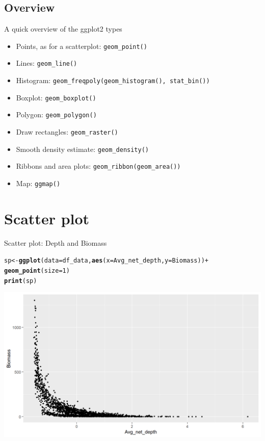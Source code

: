 \documentclass{beamer}\usepackage[]{graphicx}\usepackage[]{color}
\makeatletter
\newcommand{\hlnum}[1]{\textcolor[rgb]{0.686,0.059,0.569}{#1}}%
\newcommand{\hlopt}[1]{\textcolor[rgb]{0,0,0}{#1}}%
\newcommand{\hlstd}[1]{\textcolor[rgb]{0.345,0.345,0.345}{#1}}%
\newcommand{\hlkwb}[1]{\textcolor[rgb]{0.69,0.353,0.396}{#1}}%
\newcommand{\hlkwc}[1]{\textcolor[rgb]{0.333,0.667,0.333}{#1}}%
\newcommand{\hlkwd}[1]{\textcolor[rgb]{0.737,0.353,0.396}{\textbf{#1}}}%
\newenvironment{kframe}{%
 \def\at@end@of@kframe{}%
 \ifinner\ifhmode%
  \def\at@end@of@kframe{\end{minipage}}%
  \begin{minipage}{\columnwidth}%
 \fi\fi%
 \def\FrameCommand##1{\hskip\@totalleftmargin \hskip-\fboxsep
 \colorbox{shadecolor}{##1}\hskip-\fboxsep
     \hskip-\linewidth \hskip-\@totalleftmargin \hskip\columnwidth}%
 \MakeFramed {\advance\hsize-\width
   \@totalleftmargin\z@ \linewidth\hsize
   \@setminipage}}%
 {\par\unskip\endMakeFramed%
 \at@end@of@kframe}
\newenvironment{knitrout}{}{} %
\makeatother
\begin{document}
\subsection{Overview}
\begin{frame}[fragile]{A quick overview of the ggplot2 types}
\begin{itemize}
\item Points, as for a scatterplot: \lstinline{geom_point()}
\item Lines: \lstinline{geom_line()}
\item Histogram: \lstinline{geom_freqpoly(geom_histogram(), stat_bin())}
\item Boxplot: \lstinline{geom_boxplot()}
\item Polygon: \lstinline{geom_polygon()}
\item Draw rectangles: \lstinline{geom_raster()}
\item Smooth density estimate: \lstinline{geom_density()}
\item Ribbons and area plots: \lstinline{geom_ribbon(geom_area())}
\item Map: \lstinline{ggmap()}
\end{itemize}
\end{frame}

\section{Scatter plot}

\begin{frame}[fragile]{Scatter plot: Depth and Biomass}
\begin{knitrout}\footnotesize
{}\color{fgcolor}\begin{kframe}
\begin{alltt}
\hlstd{sp} \hlkwb{<-} \hlkwd{ggplot}\hlstd{(}\hlkwc{data}\hlstd{=df_data,} \hlkwd{aes}\hlstd{(}\hlkwc{x}\hlstd{=Avg_net_depth,} \hlkwc{y}\hlstd{=Biomass))} \hlopt{+}
  \hlkwd{geom_point}\hlstd{(}\hlkwc{size}\hlstd{=}\hlnum{1}\hlstd{)}
\hlkwd{print}\hlstd{(sp)}
\end{alltt}
\end{kframe}

{\centering \includegraphics[width=.9\linewidth]{figure/sp_base-1} 

}



\end{knitrout}
\end{frame}
\end{document}
